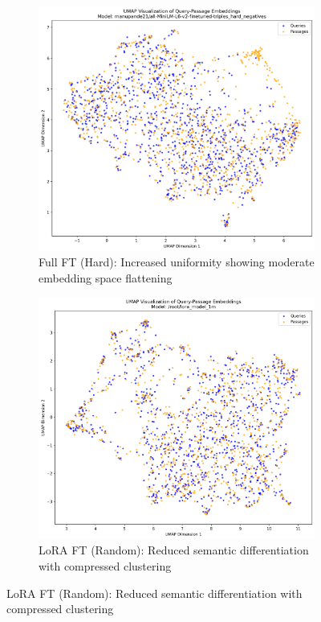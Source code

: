 \begin{figure}[p]
\vspace{0.8cm}

\begin{subfigure}{0.48\textwidth}
\centering
\includegraphics[width=\textwidth, height=0.75\textwidth, keepaspectratio]{umap_visualization_manupande21_all_MiniLM_L6_v2_finetuned_triples_hard_negatives.png}
\caption{Full FT (Hard): Increased uniformity showing moderate embedding space flattening}
\label{fig:umap_full_hard_thesis}
\end{subfigure}
\hfill
\begin{subfigure}{0.48\textwidth}
\centering
\includegraphics[width=\textwidth, height=0.75\textwidth, keepaspectratio]{umap_visualization__root_lora_model_1m.png}
\caption{LoRA FT (Random): Reduced semantic differentiation with compressed clustering}
\label{fig:umap_lora_random_thesis}
\end{subfigure}


\end{figure}
